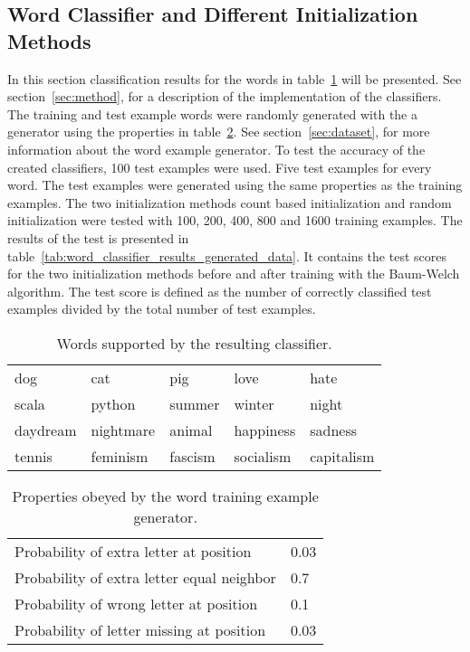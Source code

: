\subsection{Word Classifier and Different Initialization Methods}

In this section classification results for the words in table~\ref{tab:words_supported_by_classifier} will be presented. See section~\ref{sec:method}, for a description of the implementation of the classifiers. The training and test example words were randomly generated with the a generator using the properties in table~\ref{tab:word_generator_properties}. See section~\ref{sec:dataset}, for more information about the word example generator. To test the accuracy of the created classifiers, 100 test examples were used. Five test examples for every word. The test examples were generated using the same properties as the training examples. The two initialization methods count based initialization and random initialization were tested with 100, 200, 400, 800 and 1600 training examples. The results of the test is presented in table~\ref{tab:word_classifier_results_generated_data}. It contains the test scores for the two initialization methods before and after training with the Baum-Welch algorithm. The test score is defined as the number of correctly classified test examples divided by the total number of test examples.

\begin{table}[htb]
  \begin{center}
  \begin{tabular}{ l l l l l }
    dog      & cat       & pig     & love       & hate  \\
    scala    & python    & summer  & winter     & night  \\ 
    daydream & nightmare & animal  & happiness  & sadness \\ 
    tennis   & feminism  & fascism & socialism  & capitalism \\
  \end{tabular}
\end{center}
\caption{Words supported by the resulting classifier.} 
\label{tab:words_supported_by_classifier} 
\end{table}

\begin{table}[htb]
  \begin{center}
  \begin{tabular}{ l l }
    Probability of extra letter at position         & 0.03 \\
    Probability of extra letter equal neighbor      & 0.7 \\ 
    Probability of wrong letter at position         & 0.1 \\ 
    Probability of letter missing at position       & 0.03 \\
  \end{tabular}
\end{center}
\caption{Properties obeyed by the word training example generator.} 
\label{tab:word_generator_properties} 
\end{table}

